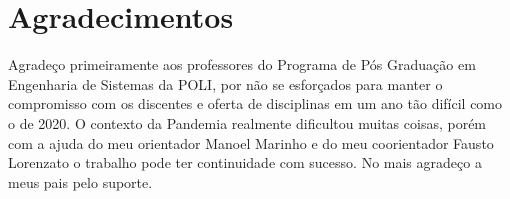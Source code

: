 \chapter*{Agradecimentos}

Agradeço primeiramente aos professores do Programa de Pós Graduação em Engenharia de Sistemas da POLI, por não se esforçados para manter o compromisso com os discentes e oferta de disciplinas em um ano tão difícil como o de 2020. O contexto da Pandemia realmente dificultou muitas coisas, porém com a ajuda do meu orientador Manoel Marinho e do meu coorientador Fausto Lorenzato o trabalho pode ter continuidade com sucesso. No mais agradeço a meus pais pelo suporte.
